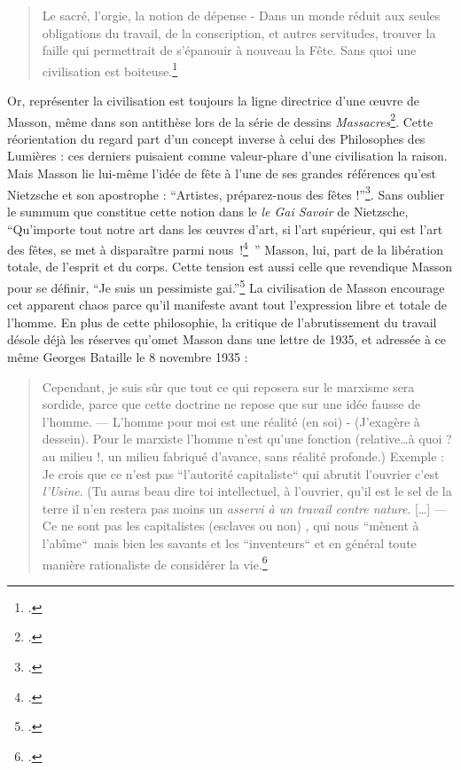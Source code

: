\begin{quote}
Le sacré, l’orgie, la notion de dépense - Dans un monde réduit aux seules obligations du travail, de la conscription, et autres servitudes, trouver la faille qui permettrait de s’épanouir à nouveau la Fête. Sans quoi une civilisation est boiteuse.\footcite[p74]{rebelle}
\end{quote}

	Or, représenter la civilisation est toujours la ligne directrice d’une \oe{}uvre de Masson, même dans son antithèse lors de la série de dessins \emph{Massacres}\footcite{massacres}. Cette réorientation du regard part d’un concept inverse à celui des Philosophes des Lumières : ces derniers puisaient comme valeur-phare d’une civilisation la raison. Mais Masson lie lui-même l’idée de fête à l’une de ses grandes références qu’est Nietzsche  et son apostrophe  : \enquote{Artistes, préparez-nous des fêtes !}\footcite[p39]{memoiremonde}. Sans oublier le summum que constitue cette notion dans le \emph{le Gai Savoir} de Nietzsche, \enquote{Qu’importe tout notre art dans les œuvres d’art, si l’art supérieur, qui est l’art des fêtes, se met à disparaître parmi nous !\footcite[]{nietzsche} }
	Masson, lui, part de la libération totale, de l’esprit et du corps. Cette tension est aussi celle que revendique Masson pour se définir, \enquote{Je suis un pessimiste gai.}\footcite[p. 8]{memoiremonde} La civilisation de Masson encourage cet apparent chaos parce qu’il manifeste avant tout l’expression libre et totale de l’homme. En plus de cette philosophie, la critique de l’abrutissement du travail désole déjà les réserves qu’omet Masson dans une lettre de 1935, et adressée à ce même Georges Bataille le 8 novembre 1935 :
	
\begin{quote}Cependant, je suis sûr que tout ce qui reposera sur le marxisme sera sordide, parce que cette doctrine ne repose que sur une idée fausse de l’homme. — L’homme pour moi est une réalité (en soi) - (J’exagère à dessein). Pour le marxiste l’homme n’est qu’une fonction (relative…à quoi ? au milieu !, un milieu fabriqué d’avance, sans réalité profonde.) Exemple : Je crois que ce n’est pas “l’autorité capitaliste“ qui abrutit l’ouvrier c’est \emph{l’Usine}. (Tu auras beau dire toi intellectuel, à l’ouvrier, qu’il est le sel de la terre il n’en restera pas moins un \emph{asservi à un travail contre nature}. […] — Ce ne sont pas les capitalistes (esclaves ou non) , qui nous “mènent à l’abîme“ mais bien les savants et les “inventeurs“ et en général toute manière rationaliste de considérer la vie.\footcite[p292]{anneessurrealistes}\end{quote}


